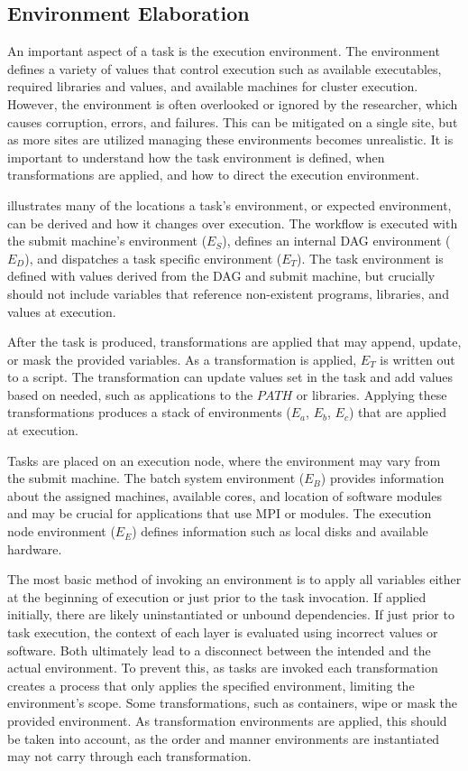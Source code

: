 \documentclass[conference]{IEEEtran}
\begin{document}
\subsection{Environment Elaboration}


An important aspect of a task is the
execution environment.
The environment defines a variety of values
that control execution such as available executables,
required libraries and values,
and available machines for cluster execution.
However, the environment is often overlooked
or ignored by the researcher,
which causes corruption, errors, and failures.
This can be mitigated on a single site,
but as more sites are utilized managing these environments
becomes unrealistic.
It is important to understand
how the task environment is defined, 
when transformations are applied, and how to
direct the execution environment.

 illustrates many of the
locations a task's environment, 
or expected environment, 
can be derived and how it
changes over execution.
The workflow is 
executed with the submit machine's environment (${E_S}$), 
defines an internal DAG environment (${E_D}$),
and dispatches a task specific environment (${E_T}$).
The task environment is defined with values derived from 
the DAG and submit machine, but crucially should 
not include variables that
reference non-existent programs, libraries, and values
at execution.

After the task is produced, 
transformations are applied that may 
append, update, or mask the provided variables.
As a transformation is applied, ${E_T}$ is 
written out to a script.
The transformation can update values set
in the task and add values based on
needed, such as applications to the $PATH$
or libraries.
Applying these transformations produces
a stack of environments 
(${E_a}$, ${E_b}$, ${E_c}$) 
that are applied at execution.

Tasks are placed on an execution node, 
where the environment may
vary from the submit machine. 
The batch system environment (${E_B}$) provides
information about the assigned machines, available cores, and location of
software modules and may be crucial 
for applications that use MPI or modules. 
The execution node environment (${E_E}$) 
defines information such as 
local disks and available hardware.

The most basic method of invoking an environment is to 
apply all variables either 
at the beginning of execution or 
just prior to the task invocation. 
If applied initially, there are likely uninstantiated
or unbound dependencies. 
If just prior to task execution, the context 
of each layer is evaluated using incorrect values or software.
Both ultimately lead to a disconnect 
between the intended and the actual environment.
To prevent this, as tasks are invoked 
each transformation creates a process
that only applies the specified environment,
limiting the environment's scope.
Some transformations, such as containers, 
wipe or mask the provided environment.
As transformation environments are applied, 
this should be taken into account, 
as the order and manner environments are instantiated 
may not carry through each transformation.
\end{document}
